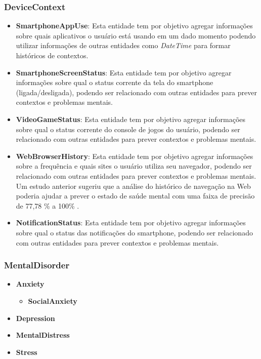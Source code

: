 \documentclass[12pt]{article}
\begin{document}
\subsubsection{DeviceContext}
    \begin{itemize}
    \item \textbf{SmartphoneAppUse}:
    Esta entidade tem por objetivo agregar informações sobre quais aplicativos o usuário está usando em um dado momento podendo utilizar informações de outras entidades como \emph{DateTime}  para formar históricos de contextos.
    \item \textbf{SmartphoneScreenStatus}:
     Esta entidade tem por objetivo agregar informações sobre qual o status corrente da tela do smartphone (ligada/desligada), podendo ser relacionado com outras entidades para prever contextos e problemas mentais.
    \item \textbf{VideoGameStatus}:
    Esta entidade tem por objetivo agregar informações sobre qual o status corrente do console de jogos do usuário, podendo ser relacionado com outras entidades para prever contextos e problemas mentais.
    \item \textbf{WebBrowserHistory}:
    Esta entidade tem por objetivo agregar informações sobre a frequência e quais sites o usuário utiliza seu navegador, podendo ser relacionado com outras entidades para prever contextos e problemas mentais. Um estudo anterior sugeriu que a análise do histórico de navegação na Web poderia ajudar a prever o estado de saúde mental com uma faixa de precisão de 77,78 \% a 100\% \cite{nie2012predicting}.
    \item \textbf{NotificationStatus}:
    Esta entidade tem por objetivo agregar informações sobre qual o status das notificações do smartphone, podendo ser relacionado com outras entidades para prever contextos e problemas mentais.
    \end{itemize}

\subsubsection{MentalDisorder}
    \begin{itemize}
    \item \textbf{Anxiety}
        \begin{itemize}
        \item \textbf{SocialAnxiety}
        \end{itemize}
    \item \textbf{Depression}
    \item \textbf{MentalDistress}
    \item \textbf{Stress}
    \end{itemize}
\end{document}
